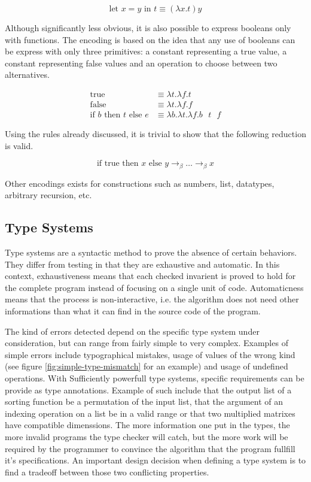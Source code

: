 \begin{displaymath}
  \text{let } x = y \text{ in } t \equiv (\lambda x. t) y
\end{displaymath}

Although significantly less obvious, it is also possible to express booleans only with functions.
The encoding is based on the idea that any use of booleans can be express with only three
primitives: a constant representing a true value, a constant representing false values and an
operation to choose between two alternatives.

\begin{align*}
  \text{true}
    & \equiv \lambda t. \lambda f. t \\
  \text{false}
    & \equiv \lambda t. \lambda f. f \\
  \text{if } b \text{ then } t \text{ else } e
    & \equiv \lambda b. \lambda t. \lambda f. b \text{ } t \text{ } f
\end{align*}

Using the rules already discussed, it is trivial to show that the following reduction is valid.

\begin{displaymath}
  \text{if true then } x \text{ else } y \to_\beta \dots \to_\beta x
\end{displaymath}

Other encodings exists for constructions such as numbers, list, datatypes, arbitrary recursion, etc.

\subsection{Type Systems}

Type systems are a syntactic method to prove the absence of certain behaviors. They differ from
testing in that they are exhaustive and automatic. In this context, exhaustiveness means that each
checked invarient is proved to hold for the complete program instead of focusing on a single unit of
code. Automaticness means that the process is non-interactive, i.e. the algorithm does not need
other informations than what it can find in the source code of the program.

The kind of errors detected depend on the specific type system under consideration, but can range
from fairly simple to very complex. Examples of simple errors include typographical mistakes, usage
of values of the wrong kind (see figure \ref{fig:simple-type-mismatch} for an example) and usage of
undefined operations. With Sufficiently powerfull type systems, specific requirements can be provide
as type annotations. Example of such include that the output list of a sorting function be a
permutation of the input list, that the argument of an indexing operation on a list be in a valid
range or that two multiplied matrixes have compatible dimenssions. The more information one put in
the types, the more invalid programs the type checker will catch, but the more work will be required
by the programmer to convince the algorithm that the program fullfill it's specifications. An
important design decision when defining a type system is to find a tradeoff between those two
conflicting properties.


